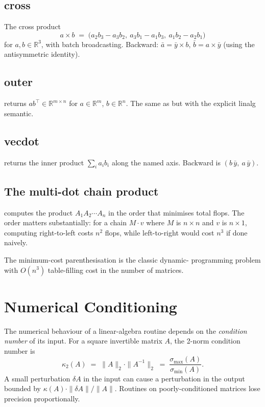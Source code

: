 \subsection{cross}
\label{ssec:linalg:cross}

The cross product
\[
a \times b \;=\; \bigl(a_2 b_3 - a_3 b_2,\ a_3 b_1 - a_1 b_3,\
a_1 b_2 - a_2 b_1\bigr)
\]
for $a, b \in \mathbb{R}^3$, with batch broadcasting. Backward:
$\bar a = \bar y \times b$, $\bar b = a \times \bar y$ (using
the antisymmetric identity).

\subsection{outer}
\label{ssec:linalg:outer}

 returns $a b^\top \in \mathbb{R}^{m \times
n}$ for $a \in \mathbb{R}^m$, $b \in \mathbb{R}^n$. The same as
 but with the explicit
linalg semantic.

\subsection{vecdot}
\label{ssec:linalg:vecdot}

 returns the inner product
$\sum_i a_i b_i$ along the named axis. Backward is
$(b\,\bar y,\ a\,\bar y)$.

\subsection{The multi-dot chain product}
\label{ssec:linalg:multi_dot}

 computes the product $A_1
A_2 \cdots A_n$ in the order that minimises total flops. The order
matters substantially: for a chain $M \cdot v$ where $M$ is
$n \times n$ and $v$ is $n \times 1$, computing right-to-left
costs $n^2$ flops, while left-to-right would cost $n^3$ if done
naively.

The minimum-cost parenthesisation is the classic dynamic-
programming problem with $O(n^3)$ table-filling cost in the
number of matrices.

\section{Numerical Conditioning}
\label{sec:linalg:conditioning}

The numerical behaviour of a linear-algebra routine depends on
the \emph{condition number} of its input. For a square invertible
matrix $A$, the 2-norm condition number is
\[
\kappa_2(A) \;=\; \|A\|_2 \cdot \|A^{-1}\|_2 \;=\; \frac{\sigma_{\max}(A)}{\sigma_{\min}(A)}.
\]
A small perturbation $\delta A$ in the input can cause a
perturbation in the output bounded by $\kappa(A) \cdot \|\delta
A\| / \|A\|$. Routines on poorly-conditioned matrices lose
precision proportionally.

